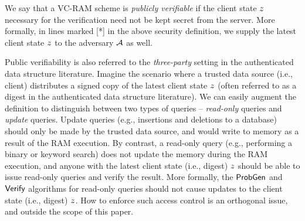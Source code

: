 We say that a VC-RAM scheme is {\it publicly verifiable} if the client
state $z$ necessary for the verification need not be kept secret from
the server.
More formally, in lines marked [*] in the above security definition,
we supply the latest client state $z$ to the adversary $\mathcal{A}$ as well.

Public verifiability is also referred to the {\it three-party} setting
in the authenticated data structure literature.
Imagine the scenario
where a trusted data source (i.e., client)
distributes a signed copy of the latest client state $z$ (often
referred to as a digest in the authenticated data structure literature).
We can easily augment the definition to distinguish between two types of queries --
{\it read-only} queries and {\it update} queries.
Update queries (e.g., insertions and deletions to a database)
should only be made by the trusted data source,
and would write to memory as a result of the RAM execution.
By contrast, a read-only query (e.g., performing a binary or keyword search)
does not update the memory during the RAM execution,
and anyone with the latest client state (i.e., digest) $z$ should be able to issue read-only queries and
verify the result.
More formally, the $\mathsf{ProbGen}$ and $\mathsf{Verify}$ algorithms for read-only queries
should not cause updates to the client state (i.e., digest) $z$.
How to enforce such access control is an orthogonal issue, and outside the scope of this paper.
